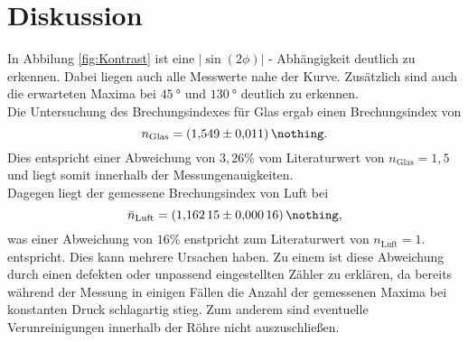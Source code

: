 \FloatBarrier
\newpage
\section{Diskussion}
In Abbilung \ref{fig:Kontrast} ist eine $|\sin{(2\phi)}|$ - Abhängigkeit deutlich zu erkennen.
Dabei liegen auch alle Messwerte nahe der Kurve.
Zusätzlich sind auch die erwarteten Maxima bei $\SI{45}{\degree}$ und $\SI{130}{\degree}$ deutlich zu erkennen. \\
Die Untersuchung des Brechungsindexes für Glas ergab einen Brechungsindex von
\begin{equation}
    n_\text{Glas} = \SI{1.549 \pm 0.011}{\nothing} .
\end{equation}
Dies entspricht einer Abweichung von $3,26 \%$ vom Literaturwert von $n_\text{Glas} = 1,5$ und liegt somit innerhalb der Messungenauigkeiten.  \\
Dagegen liegt der gemessene Brechungsindex von Luft bei
\begin{equation}
    \bar{n}_\text{Luft} = \SI{1.16215 \pm 0.00016}{\nothing} ,
 \end{equation}
was einer Abweichung von $16 \%$ enstpricht zum Literaturwert von $n_\text{Luft} = 1$. entspricht. Dies kann mehrere Ursachen haben. Zu einem ist diese Abweichung durch einen defekten oder unpassend eingestellten Zähler zu erklären, da bereits während der Messung in einigen Fällen die Anzahl der gemessenen Maxima bei konstanten Druck schlagartig stieg. Zum anderem sind eventuelle Verunreinigungen innerhalb der Röhre nicht auszuschließen.
